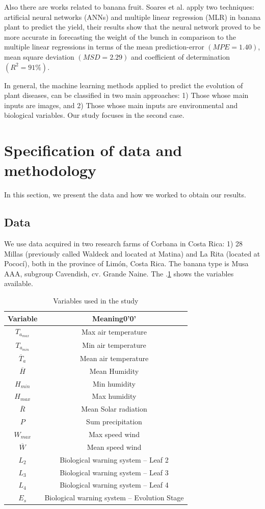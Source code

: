 \documentclass[review,authoryear,english]{elsarticle}
\begin{document}
Also there are works related to banana fruit. Soares et al. \citep{Soares2014} apply two techniques: artificial neural networks (ANNs) and multiple linear regression (MLR) in banana plant to predict the yield, their results show that the neural network proved to be more accurate in forecasting the weight of the bunch in comparison to the multiple linear regressions in terms of the mean prediction-error $(MPE = 1.40)$, mean square deviation $(MSD = 2.29)$ and coefficient of determination $(R^2 = 91\%)$.

In general, the machine learning methods applied to predict the evolution of plant diseases, can be classified in two main approaches: 1) Those whose main inputs are images, and 2) Those whose main inputs are environmental and biological variables. Our study focuses in the second case.

\section{Specification of data and methodology}
\label{sec:data}

In this section, we present the data and how we worked to obtain our results.

\subsection{Data}
We use data acquired in two research farms of Corbana in Costa Rica: 1) 28 Millas (previously called Waldeck and located at Matina) and La Rita (located at Pococí), both in the province of Limón, Costa Rica. The banana type is Musa AAA, subgroup Cavendish, cv. Grande Naine. The \tablename $.$\ref{tabla1} shows the variables available.

\begin{table}[h] 
\caption{Variables used in the study} 
\label{tabla1} 
\centering
\begin{tabular}{c|c} 
\hline
\bfseries Variable & \bfseries Meaning0'0' \\ 
\hline\hline 
$T_{a_{max}}$ &	Max air temperature \\
$T_{a_{min}}$ &	Min air temperature \\
$\overline{T}_{a}$	 & Mean air temperature \\
$\overline{H}$	&  Mean Humidity \\
$H_{min}$ &	Min humidity \\
$H_{max}$	& Max humidity \\
$\overline{R}$	& Mean Solar radiation \\
$P$	& Sum precipitation  \\
$W_{max}$	& Max speed wind \\
$\overline{W}$	& Mean speed wind  \\
$L_2$	& Biological warning system – Leaf 2 \\
$L_3$	& Biological warning system – Leaf 3 \\
$L_4$	& Biological warning system – Leaf 4 \\
$E_s$	& Biological warning system – Evolution Stage \\
\hline
\end{tabular} 
\end{table}
\end{document}
